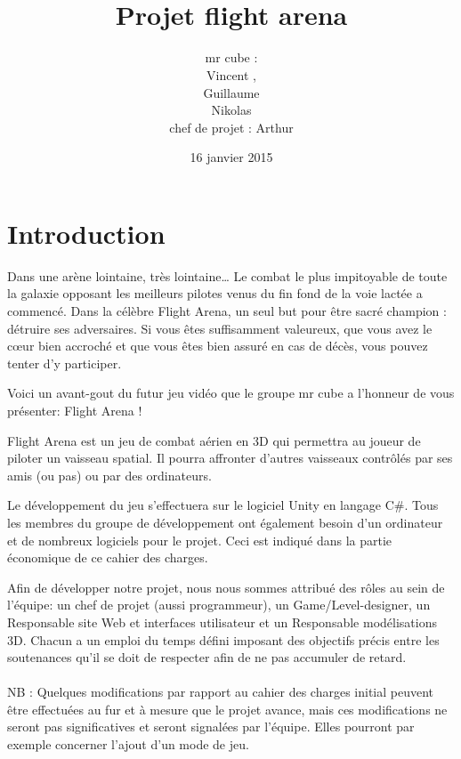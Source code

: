 \documentclass[10pt, titlepage]{report}
\title{\bsc{cahier des charges}\\Projet flight arena}
\author{mr cube :\\
Vincent \bsc{Rospini-Clerici},\\
Guillaume \bsc{Rebut}\\
Nikolas \bsc{Miletic}\\
chef de projet : Arthur \bsc{Remaud}}
\date{16 janvier 2015}
\begin{document}
\maketitle

\renewcommand{\contentsname}{Sommaire}
\renewcommand{\chaptername}{Partie}

\tableofcontents

\chapter{Introduction}

Dans une arène lointaine, très lointaine… Le combat le plus impitoyable de toute la galaxie opposant les meilleurs pilotes venus du fin fond de la voie lactée a commencé. Dans la célèbre Flight Arena, un seul but pour être sacré champion : détruire ses adversaires. Si vous êtes suffisamment valeureux, que vous avez le cœur bien accroché et que vous êtes bien assuré en cas de décès, vous pouvez tenter d’y participer.

Voici un avant-gout du futur jeu vidéo que le groupe mr cube a l’honneur de vous présenter: Flight Arena !

Flight Arena est un jeu de combat aérien en 3D qui permettra au joueur de piloter un vaisseau spatial. Il pourra affronter d’autres vaisseaux contrôlés par ses amis (ou pas) ou par des ordinateurs.

Le développement du jeu s’effectuera sur le logiciel Unity en langage C\#. Tous les membres du groupe de développement ont également besoin d’un ordinateur et de nombreux logiciels pour le projet. Ceci est indiqué dans la partie économique de ce cahier des charges.

Afin de développer notre projet, nous nous sommes attribué des rôles au sein de l’équipe: un chef de projet (aussi programmeur), un Game/Level-designer, un Responsable site Web et interfaces utilisateur et un Responsable modélisations 3D. Chacun a un emploi du temps défini imposant des objectifs précis entre les soutenances qu’il se doit de respecter afin de ne pas accumuler de retard.\\ \\

NB : Quelques modifications par rapport au cahier des charges initial peuvent être effectuées au fur et à mesure que le projet avance, mais ces modifications ne seront pas significatives et seront signalées par l’équipe. Elles pourront par exemple concerner l’ajout d’un mode de jeu.
\end{document}
